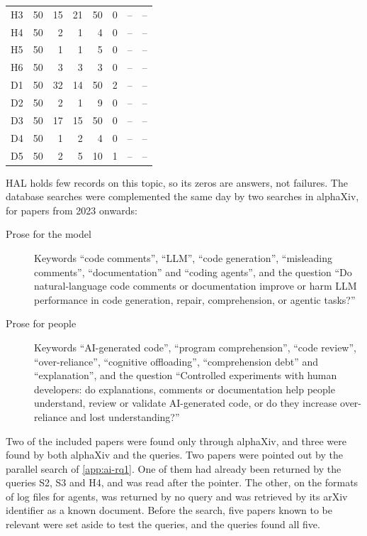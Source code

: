 \begin{table}[htbp]
\begin{sidecaption}
\begin{tabular}{@{}lrrrrrrr@{}}
      H3 & 50 & 15  & 21   & 50    & 0   & -- & --   \\
      H4 & 50 & 2   & 1    & 4     & 0   & -- & --   \\
      H5 & 50 & 1   & 1    & 5     & 0   & -- & --   \\
      H6 & 50 & 3   & 3    & 3     & 0   & -- & --   \\
      \midrule
      D1 & 50 & 32  & 14   & 50    & 2   & -- & --   \\
      D2 & 50 & 2   & 1    & 9     & 0   & -- & --   \\
      D3 & 50 & 17  & 15   & 50    & 0   & -- & --   \\
      D4 & 50 & 1   & 2    & 4     & 0   & -- & --   \\
      D5 & 50 & 2   & 5    & 10    & 1   & -- & --   \\
      \bottomrule
    \end{tabular}
  \end{sidecaption}
\end{table}

HAL holds few records on this topic, so its zeros are answers, not failures.
The database searches were complemented the same day by two searches in
alphaXiv, for papers from 2023 onwards:
\begin{description}
  \item[Prose for the model] Keywords \enquote{code comments}, \enquote{LLM},
    \enquote{code generation}, \enquote{misleading comments},
    \enquote{documentation} and \enquote{coding agents}, and the question
    \enquote{Do natural-language code comments or documentation improve or harm
    LLM performance in code generation, repair, comprehension, or agentic
    tasks?}
  \item[Prose for people] Keywords \enquote{AI-generated code},
    \enquote{program comprehension}, \enquote{code review},
    \enquote{over-reliance}, \enquote{cognitive offloading},
    \enquote{comprehension debt} and \enquote{explanation}, and the question
    \enquote{Controlled experiments with human developers: do explanations,
    comments or documentation help people understand, review or validate
    AI-generated code, or do they increase over-reliance and lost
    understanding?}
\end{description}
Two of the included papers were found only through alphaXiv, and three were
found by both alphaXiv and the queries.
Two papers were pointed out by the parallel search of \cref{app:ai-rq1}.
One of them\autocite{eghbali2026equivalence} had already been returned by the
queries S2, S3 and H4, and was read after the pointer.
The other\autocite{ustynov2026beyond}, on the formats of log files for agents,
was returned by no query and was retrieved by its arXiv identifier as a known
document.
Before the search, five papers known to be relevant were set aside to test the
queries, and the queries found all five.

